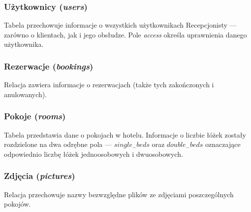 \documentclass [11pt, a4paper, leqno] {article}
\begin{document}
\subsubsection{Użytkownicy (\textit{users})}
\noindent
Tabela przechowuje informacje o wszystkich użytkownikach Recepcjonisty --- zarówno o klientach, jak i  jego obsłudze. Pole \textit{access} określa uprawnienia danego użytkownika.

\subsubsection{Rezerwacje (\textit{bookings})}
\noindent
Relacja zawiera informacje o rezerwacjach (także tych zakończonych i anulowanych).

\subsubsection{Pokoje (\textit{rooms})}
\noindent
Tabela przedstawia dane o pokojach w hotelu. Informacje o liczbie łóżek zostały rozdzielone na dwa odrębne pola --- \textit{$single_{-}beds$} oraz \textit{$double_{-}beds$} oznaczające odpowiednio liczbę łóżek jednoosobowych i dwuosobowych.

\subsubsection{Zdjęcia (\textit{pictures})}
\noindent
Relacja przechowuje nazwy bezwzględne plików ze zdjęciami poszczególnych pokojów.
\end{document}
